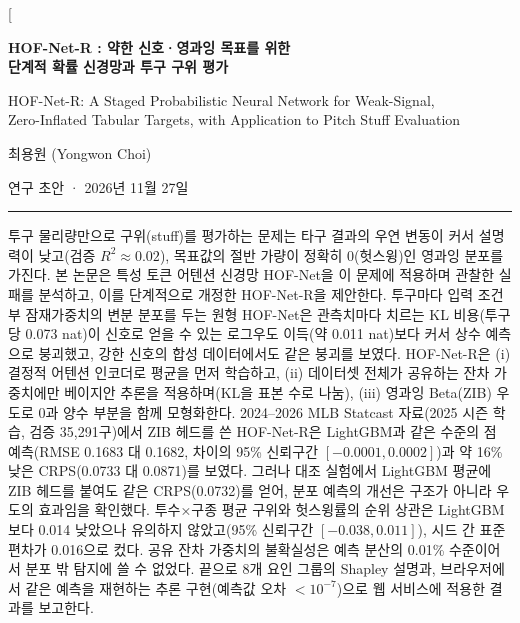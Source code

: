 \documentclass[journal,a4paper,10pt]{IEEEtran}
\begin{document}
\twocolumn[{%
\begin{center}
{\fontsize{19pt}{24pt}\selectfont\sffamily\bfseries HOF-Net-R : 약한 신호·영과잉 목표를 위한\\[2pt] 단계적 확률 신경망과 투구 구위 평가\par}
\vspace{6pt}
{\large HOF-Net-R: A Staged Probabilistic Neural Network for Weak-Signal,\\ Zero-Inflated Tabular Targets, with Application to Pitch Stuff Evaluation\par}
\vspace{10pt}
{\large 최용원 \;(Yongwon Choi)\par}
\vspace{3pt}
{\small 연구 초안 · 2026년 11월 27일\par}
\end{center}
\vspace{6pt}
\noindent\rule{\textwidth}{0.4pt}\par\vspace{4pt}
\noindent\begin{minipage}{\textwidth}
\small
{}\quad
투구 물리량만으로 구위(stuff)를 평가하는 문제는 타구 결과의 우연 변동이 커서 설명력이 낮고(검증 $R^2\approx0.02$), 목표값의 절반 가량이 정확히 0(헛스윙)인 영과잉 분포를 가진다. 본 논문은 특성 토큰 어텐션 신경망 HOF-Net을 이 문제에 적용하며 관찰한 실패를 분석하고, 이를 단계적으로 개정한 HOF-Net-R을 제안한다. 투구마다 입력 조건부 잠재가중치의 변분 분포를 두는 원형 HOF-Net은 관측치마다 치르는 KL 비용(투구당 0.073 nat)이 신호로 얻을 수 있는 로그우도 이득(약 0.011 nat)보다 커서 상수 예측으로 붕괴했고, 강한 신호의 합성 데이터에서도 같은 붕괴를 보였다. HOF-Net-R은 (i) 결정적 어텐션 인코더로 평균을 먼저 학습하고, (ii) 데이터셋 전체가 공유하는 잔차 가중치에만 베이지안 추론을 적용하며(KL을 표본 수로 나눔), (iii) 영과잉 Beta(ZIB) 우도로 0과 양수 부분을 함께 모형화한다. 2024–2026 MLB Statcast 자료(2025 시즌 학습, 검증 35,291구)에서 ZIB 헤드를 쓴 HOF-Net-R은 LightGBM과 같은 수준의 점 예측(RMSE 0.1683 대 0.1682, 차이의 95\% 신뢰구간 $[-0.0001, 0.0002]$)과 약 16\% 낮은 CRPS(0.0733 대 0.0871)를 보였다. 그러나 대조 실험에서 LightGBM 평균에 ZIB 헤드를 붙여도 같은 CRPS(0.0732)를 얻어, 분포 예측의 개선은 구조가 아니라 우도의 효과임을 확인했다. 투수×구종 평균 구위와 헛스윙률의 순위 상관은 LightGBM보다 0.014 낮았으나 유의하지 않았고(95\% 신뢰구간 $[-0.038, 0.011]$), 시드 간 표준편차가 0.016으로 컸다. 공유 잔차 가중치의 불확실성은 예측 분산의 0.01\% 수준이어서 분포 밖 탐지에 쓸 수 없었다. 끝으로 8개 요인 그룹의 Shapley 설명과, 브라우저에서 같은 예측을 재현하는 추론 구현(예측값 오차 $<10^{-7}$)으로 웹 서비스에 적용한 결과를 보고한다.


\end{minipage}}
\end{document}
